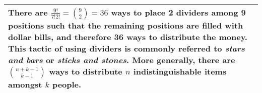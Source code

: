 {\begin{tabu}{|p{16cm} |}

There are $ \frac{9!}{7!2!} = {9 \choose 2}  = 36 $ ways to place 2 dividers among 9 positions such that the remaining positions are filled with dollar bills, and therefore 36 ways to distribute the money. This tactic of using dividers is commonly referred to \textit{stars and bars} or \textit{sticks and stones}. More generally, there are ${n+k-1 \choose k-1}$ ways to distribute $n$ indistinguishable items amongst $k$ people. \newline
\\
\hline
\end{tabu}
}


